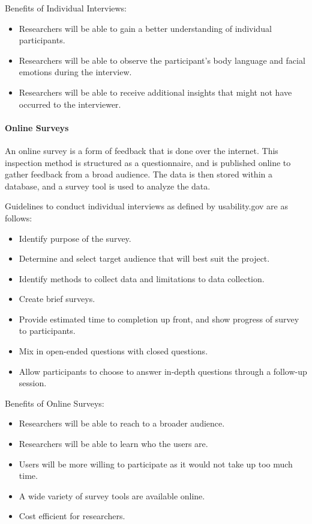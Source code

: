Benefits of Individual Interviews:
\begin{itemize}
\item Researchers will be able to gain a better understanding of individual participants.
\item Researchers will be able to observe the participant's body language and facial emotions during the interview.
\item Researchers will be able to receive additional insights that might not have occurred to the interviewer.
\end{itemize}

\paragraph{Online Surveys} 
An online survey is a form of feedback that is done over the internet.
This inspection method is structured as a questionnaire, and is published online to gather feedback from a broad audience.
The data is then stored within a database, and a survey tool is used to analyze the data.

Guidelines to conduct individual interviews as defined by usability.gov are as follows:
\begin{itemize}
\item Identify purpose of the survey.
\item Determine and select target audience that will best suit the project.
\item Identify methods to collect data and limitations to data collection.
\item Create brief surveys.
\item Provide estimated time to completion up front, and show progress of survey to participants.
\item Mix in open-ended questions with closed questions.
\item Allow participants to choose to answer in-depth questions through a follow-up session.
\end{itemize}

Benefits of Online Surveys:
\begin{itemize}
\item Researchers will be able to reach to a broader audience.
\item Researchers will be able to learn who the users are.
\item Users will be more willing to participate as it would not take up too much time.
\item A wide variety of survey tools are available online.
\item Cost efficient for researchers.
\end{itemize}

